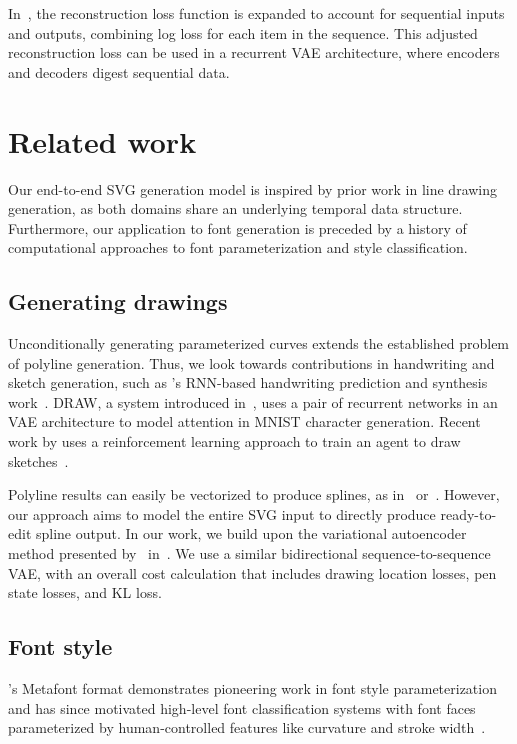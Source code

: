In~\cite{graves2013generating}, the reconstruction loss function is expanded to account for sequential inputs and outputs, combining log loss for each item in the sequence.
This adjusted reconstruction loss can be used in a recurrent VAE architecture, where encoders and decoders digest sequential data.

\section{Related work}
Our end-to-end SVG generation model is inspired by prior work in line drawing generation, as both domains share an underlying temporal data structure.
Furthermore, our application to font generation is preceded by a history of computational approaches to font parameterization and style classification.

\subsection{Generating drawings}
Unconditionally generating parameterized curves extends the established problem of polyline generation.
Thus, we look towards contributions in handwriting and sketch generation, such as \citeauthor{graves2013generating}'s RNN-based handwriting prediction and synthesis work~\cite{graves2013generating}.
DRAW, a system introduced in~\cite{gregor2015draw}, uses a pair of recurrent networks in an VAE architecture to model attention in MNIST character generation.
Recent work by \citeauthor{ganin2017synthesizing} uses a reinforcement learning approach to train an agent to draw sketches~\cite{ganin2017synthesizing}.

Polyline results can easily be vectorized to produce splines, as in~\cite{janssen1997adaptive} or~\cite{birdal2014novel}.
However, our approach aims to model the entire SVG input to directly produce ready-to-edit spline output.
In our work, we build upon the variational autoencoder method presented by~\citeauthor{ha2017neural} in~\cite{ha2017neural}.
We use a similar bidirectional sequence-to-sequence VAE, with an overall cost calculation that includes drawing location losses, pen state losses, and KL loss.

\subsection{Font style}
\citeauthor{knuth1979tex}'s Metafont format demonstrates pioneering work in font style parameterization and has since motivated high-level font classification systems with font faces parameterized by human-controlled features like curvature and stroke width~\cite{knuth1979tex}\cite{lau2009learning}\cite{hassan2010next}.

